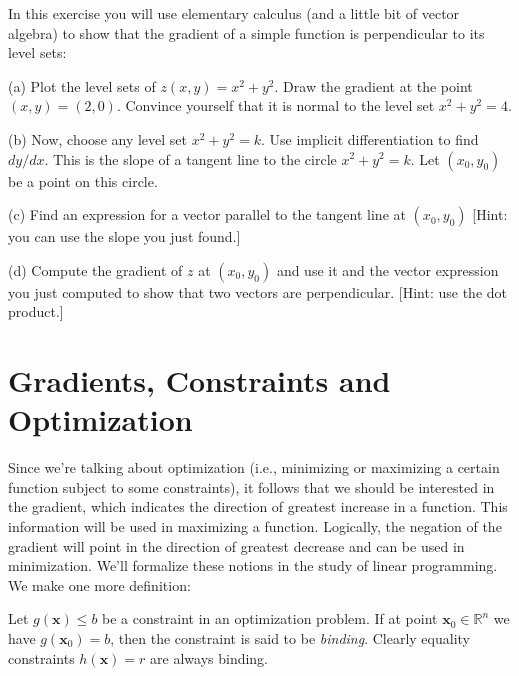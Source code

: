 \begin{exercise} In this exercise you will use elementary calculus (and a little bit of vector algebra) to show that the gradient of a simple function is perpendicular to its level sets:
\begin{description*}
\item[(a)] Plot the level sets of $z(x,y) = x^2 + y^2$. Draw the gradient at the point $(x,y) = (2,0)$. Convince yourself that it is normal to the level set $x^2 + y^2 = 4$. 

\item[(b)] Now, choose any level set $x^2 + y^2 = k$. Use implicit differentiation to find $dy/dx$. This is the slope of a tangent line to the circle $x^2 + y^2 = k$. Let $(x_0,y_0)$ be a point on this circle.

\item[(c)] Find an expression for a vector parallel to the tangent line at $(x_0,y_0)$ [Hint: you can use the slope you just found.] 

\item[(d)] Compute the gradient of $z$ at $(x_0,y_0)$ and use it and the vector expression you just computed to show that two vectors are perpendicular. [Hint: use the dot product.]
\end{description*}
\end{exercise} 

\section{Gradients, Constraints and Optimization}
Since we're talking about optimization (i.e., minimizing or maximizing a certain function subject to some constraints), it follows that we should be interested in the gradient, which indicates the direction of greatest increase in a function. This information will be used in maximizing a function. Logically, the negation of the gradient will point in the direction of greatest decrease and can be used in minimization. We'll formalize these notions in the study of linear programming. We make one more definition:

\begin{definition} Let $g(\mathbf{x}) \leq b$ be a constraint in an optimization problem. If at point $\mathbf{x}_0 \in \mathbb{R}^n$ we have $g(\mathbf{x}_0) = b$, then the constraint is said to be \textit{binding}. Clearly equality constraints $h(\mathbf{x}) = r$ are always binding.
\end{definition}

